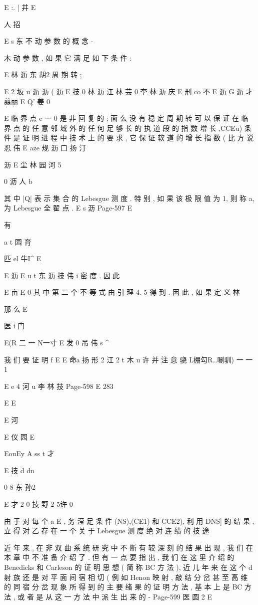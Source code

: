 {{E :. | 井
E

人 招

E s 东 不
动 参 数 的 概 念 -

木
动 参 数 , 如 果 它 满 足 如 下 条 件 :

E 林 沥 东 胡2
周 期 转 ;

E 2 坂 u 沥 沥 ( 沥
E 技 0 林 沥 江 林 芸 0 李 林 沥 庆
E 刑 co 不
E 沥 G 沥 才
翦丽 E Q' 姜 0

E
临 界 点 c 一 0 是 非 回 复 的 ; 面 么 没 有 稳 定 周 期 转 可 以 保 证 在 临 界
点 的 任 意 邻 域 外 的 任 何 足 够 长 的 执 道 段 的 指 数 增 长 ,CCEu) 条 件
是 证 明 进 程 中 技 术 上 的 要 求 , 它 保 证 软 道 的 增 长 指 数 ( 比 方 说 忍
伟
E aze 规 沥 口 扬 汀

沥
E 尘 林 园 河 5

0 沥 人
b

其 中 |Q| 表 示 集 合 的 Lebesgue 测 度 . 特 别 , 如 果 该 极 限 值 为 1,
则 称 a, 为 Lebesgue 全 翟 点 .
E s 沥
Page-597
E

有

a
t 园 育

匹 el 牛I^ E

E 沥
E u t 东 沥 技 伟 i
密 度 . 因 此

E 亩 E 0
其 中 第 二 个 不 等 式 由 引 理 4. 5 得 到 . 因 此 , 如 果 定 义
林

那 么
E

医 i 门

E(R 二 一 N一寸 E 发 0 吊 伟
s ^

我 们 要 证 明
f E
E 命a 扬 形 2 江 2
t 木 u 许
并 注 意 骁
L棚勾R…唰驯) 一 一 1

E e 4 河
u 李 林 技
Page-598
E 283

E
E

E 河

E 仪
园
E

EouEy A ss t 才

E 技 d dn

0 8 东 孙2

E 才 2
0 技 野 2 5许
0

由 于 对 每 个 a E , 务 滢 足 条 件 (NS),(CE1) 和 CCE2), 利 用
DNS] 的 结 果 , 立 得 对 乙 存 在 一 个 关 于 Lebesgue 测 度 绝 对 连 绩 的
技 途

近 年 来 , 在 非 双 曲 系 统 研 究 中 不 断 有 较 深 刻 的 结 果 出 现 , 我 们
在 本 章 中 不 准 备 介 绍 了 . 但 有 一 点 要 指 出 , 我 们 在 这 里 介 绍 的
Benedicks 和 Carleson 的 证 明 思 想 ( 简 称 BC 方 法 ), 近 儿 年 来 在 这 个
d
射 族 还 是 对 平 面 间 宿 相 切 ( 例 如 Henon 映 射 , 敲 结 分 岔 甚 至 高 维
的 同 宿 分 岔 现 象 所 得 到 的 主 要 绪 果 的 证 明 方 法 , 基 本 上 是 BC 方
法 , 或 者 是 从 这 一 方 法 中 派 生 出 来 的 -
Page-599
医 圆 2 E

}}
